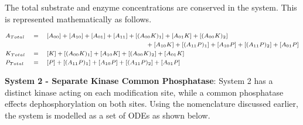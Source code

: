 \documentclass[9pt,lineno]{elife}
\begin{document}
\begin{appendixbox}
The total substrate and enzyme concentrations are conserved in the system. This is represented mathematically as follows.
    
\begin{equation}
\scriptsize{
    \begin{alignedat}{3}    
        & A_{Total} \quad &&= \quad [A_{00}]+[A_{10}]+[A_{01}]+[A_{11}]+[(A_{00}K)_1]+[A_{01}K]+[(A_{00}K)_2] && \\
        & && \hspace{50mm} + [A_{10}K]+[(A_{11}P)_1]+[A_{10}P]+[(A_{11}P)_2]+[A_{01}P] && \\
        & K_{Total} \quad &&= \quad [K]+[(A_{00}K)_1]+[A_{10}K]+[(A_{00}K)_2]+[A_{01}K] && \\
        & P_{Total} \quad &&= \quad [P]+[(A_{11}P)_1]+[A_{10}P]+[(A_{11}P)_2]+[A_{01}P] && \\
    \end{alignedat}}
\end{equation}     
    
\textbf{System 2 - Separate Kinase Common Phosphatase}: System 2 has a distinct kinase acting on each modification site, while a common phosphatase effects dephosphorylation on both sites. Using the nomenclature discussed earlier, the system is modelled as a set of ODEs as shown below. 


\end{appendixbox}
\end{document}

